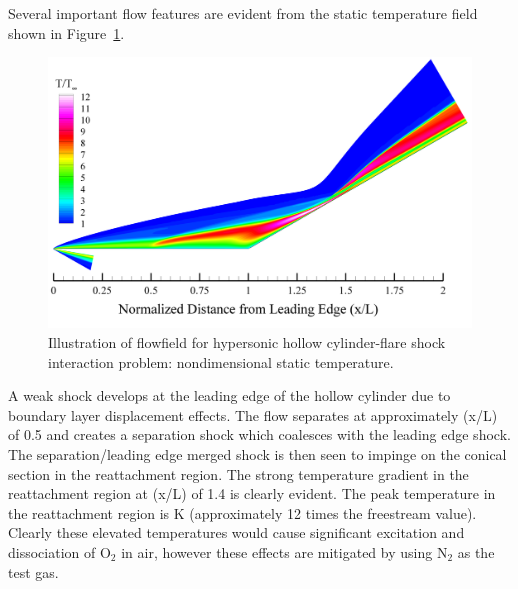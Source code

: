 \clearpage
Several important flow features are evident from the static temperature field shown in Figure~\ref{fig:holden_hollow_cylinder_global_T}.
\begin{figure}[hbtp]
  \begin{center}
    \includegraphics[width=\textwidth]{figures/holden_hollow_cylinder/T}
    \caption{Illustration of flowfield for hypersonic hollow cylinder-flare shock interaction problem: nondimensional static temperature.\label{fig:holden_hollow_cylinder_global_T}}
  \end{center}
\end{figure}
 A weak shock develops at the leading edge of the hollow cylinder due to boundary layer displacement effects.  The flow separates at approximately (x/L) of 0.5 and creates a separation shock which coalesces with the leading edge shock.  The separation/leading edge merged shock is then seen to impinge on the conical section in the reattachment region.  The strong temperature gradient in the reattachment region at (x/L) of 1.4 is clearly evident.  The peak temperature in the reattachment region is \unit[1450]{K} (approximately 12 times the freestream value).  Clearly these elevated temperatures would cause significant excitation and dissociation of O$_2$ in air, however these effects are mitigated by using N$_2$ as the test gas.  

